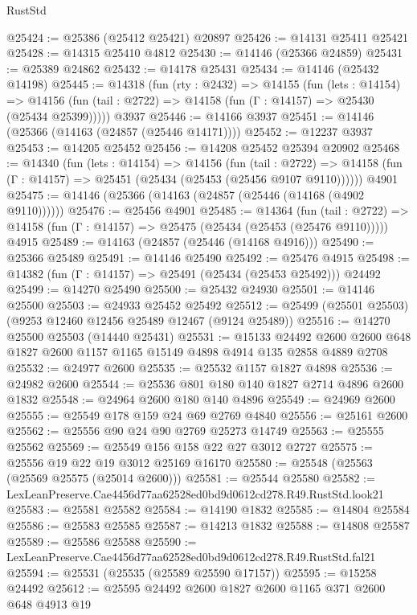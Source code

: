 \begin{lexlean}{RustStd}
\begin{coremodule}
@25424 := @25386 (@25412 @25421) @20897
@25426 := @14131 @25411 @25421
@25428 := @14315 @25410 @4812
@25430 := @14146 (@25366 @24859)
@25431 := @25389 @24862
@25432 := @14178 @25431
@25434 := @14146 (@25432 @14198)
@25445 := @14318
    (fun (rty : @2432) =>
    @14155
      (fun (lets : @14154) =>
      @14156 (fun (tail : @2722) => @14158 (fun (Γ : @14157) => @25430 (@25434 @25399)))))
    @3937
@25446 := @14166 @3937
@25451 := @14146 (@25366 (@14163 (@24857 (@25446 @14171))))
@25452 := @12237 @3937
@25453 := @14205 @25452
@25456 := @14208 @25452 @25394 @20902
@25468 := @14340
    (fun (lets : @14154) =>
    @14156
      (fun (tail : @2722) =>
      @14158 (fun (Γ : @14157) => @25451 (@25434 (@25453 (@25456 @9107 @9110))))))
    @4901
@25475 := @14146 (@25366 (@14163 (@24857 (@25446 (@14168 (@4902 @9110))))))
@25476 := @25456 @4901
@25485 := @14364
    (fun (tail : @2722) => @14158 (fun (Γ : @14157) => @25475 (@25434 (@25453 (@25476 @9110)))))
    @4915
@25489 := @14163 (@24857 (@25446 (@14168 @4916)))
@25490 := @25366 @25489
@25491 := @14146 @25490
@25492 := @25476 @4915
@25498 := @14382 (fun (Γ : @14157) => @25491 (@25434 (@25453 @25492))) @24492
@25499 := @14270 @25490
@25500 := @25432 @24930
@25501 := @14146 @25500
@25503 := @24933 @25452 @25492
@25512 := @25499 (@25501 @25503) (@9253 @12460 @12456 @25489 @12467 (@9124 @25489))
@25516 := @14270 @25500 @25503 (@14440 @25431)
@25531 := @15133
    @24492
    @2600
    @2600
    @648
    @1827
    @2600
    @1157
    @1165
    @15149
    @4898
    @4914
    @135
    @2858
    @4889
    @2708
@25532 := @24977 @2600
@25535 := @25532 @1157 @1827 @4898
@25536 := @24982 @2600
@25544 := @25536 @801 @180 @140 @1827 @2714 @4896 @2600 @1832
@25548 := @24964 @2600 @180 @140 @4896
@25549 := @24969 @2600
@25555 := @25549 @178 @159 @24 @69 @2769 @4840
@25556 := @25161 @2600
@25562 := @25556 @90 @24 @90 @2769 @25273 @14749
@25563 := @25555 @25562
@25569 := @25549 @156 @158 @22 @27 @3012 @2727
@25575 := @25556 @19 @22 @19 @3012 @25169 @16170
@25580 := @25548 (@25563 (@25569 @25575 (@25014 @2600)))
@25581 := @25544 @25580
@25582 := LexLeanPreserve.Cae4456d77aa62528ed0bd9d0612cd278.R49.RustStd.look21
@25583 := @25581 @25582
@25584 := @14190 @1832
@25585 := @14804 @25584
@25586 := @25583 @25585
@25587 := @14213 @1832
@25588 := @14808 @25587
@25589 := @25586 @25588
@25590 := LexLeanPreserve.Cae4456d77aa62528ed0bd9d0612cd278.R49.RustStd.fal21
@25594 := @25531 (@25535 (@25589 @25590 @17157))
@25595 := @15258 @24492
@25612 := @25595
    @24492
    @2600
    @1827
    @2600
    @1165
    @371
    @2600
    @648
    @4913
    @19

\end{coremodule}
\end{lexlean}
